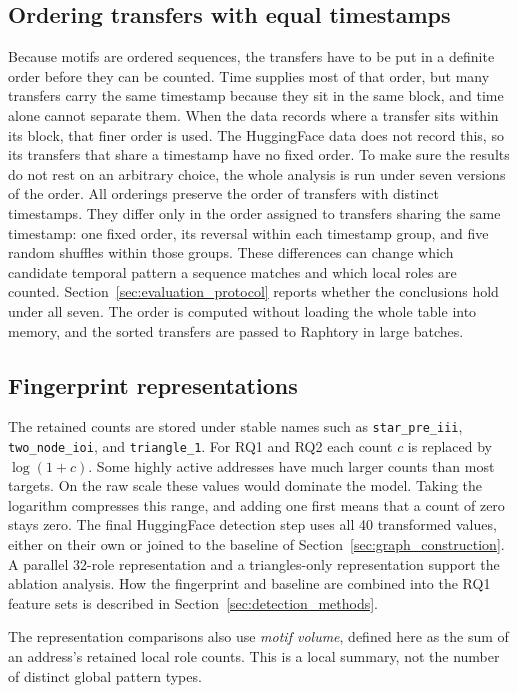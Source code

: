\subsection{Ordering transfers with equal timestamps}

Because motifs are ordered sequences, the transfers have to be put in a definite
order before they can be counted. Time supplies most of that order, but many
transfers carry the same timestamp because they sit in the same block, and time
alone cannot separate them. When the data records where a transfer sits within its
block, that finer order is used. The HuggingFace data does not record this, so its
transfers that share a timestamp have no fixed order. To make sure the results do
not rest on an arbitrary choice, the whole analysis is run under seven versions of
the order. All orderings preserve the order of transfers with distinct
timestamps. They differ only in the order assigned to transfers sharing the
same timestamp: one fixed order, its reversal within each timestamp group, and
five random shuffles within those groups. These differences can change which
candidate temporal pattern a sequence matches and which local roles are counted.
Section~\ref{sec:evaluation_protocol} reports whether the conclusions hold under
all seven. The order is computed without loading the whole table into memory, and
the sorted transfers are passed to Raphtory in large batches.

\subsection{Fingerprint representations}

The retained counts are stored under stable names such as \texttt{star\_pre\_iii},
\texttt{two\_node\_ioi}, and \texttt{triangle\_1}. For RQ1 and RQ2 each count
$c$ is replaced by $\log(1+c)$. Some highly active addresses have much larger
counts than most targets. On the raw scale these values would dominate the model.
Taking the logarithm compresses this range, and adding one first means that a
count of zero stays zero. The final HuggingFace detection step uses all 40
transformed values, either on their own or joined to the baseline of
Section~\ref{sec:graph_construction}. A parallel 32-role representation and a
triangles-only representation support the ablation analysis. How the fingerprint
and baseline are combined into the RQ1 feature sets is described in
Section~\ref{sec:detection_methods}.

The representation comparisons also use \emph{motif volume}, defined here as
the sum of an address's retained local role counts. This is a local summary,
not the number of distinct global pattern types.

